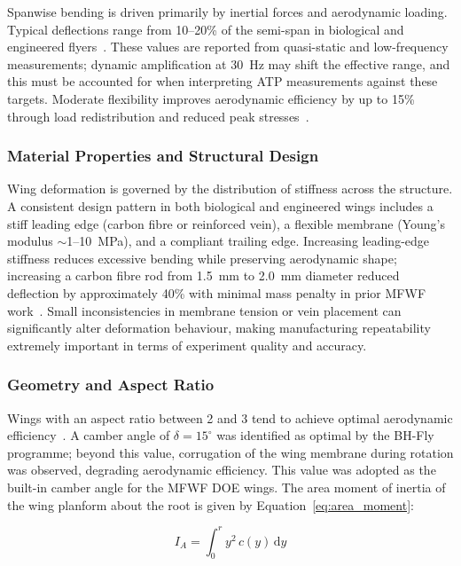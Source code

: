 Spanwise bending is driven primarily by inertial forces and aerodynamic loading. Typical deflections range from 10--20\% of the semi-span in biological and engineered flyers~\cite{combes2003flexural}. These values are reported from quasi-static and low-frequency measurements; dynamic amplification at 30~Hz may shift the effective range, and this must be accounted for when interpreting ATP measurements against these targets. Moderate flexibility improves aerodynamic efficiency by up to 15\% through load redistribution and reduced peak stresses~\cite{kang2011effects}.

\subsubsection{Material Properties and Structural Design}

Wing deformation is governed by the distribution of stiffness across the structure. A consistent design pattern in both biological and engineered wings includes a stiff leading edge (carbon fibre or reinforced vein), a flexible membrane (Young's modulus $\sim$1--10~MPa), and a compliant trailing edge. Increasing leading-edge stiffness reduces excessive bending while preserving aerodynamic shape; increasing a carbon fibre rod from 1.5~mm to 2.0~mm diameter reduced deflection by approximately 40\% with minimal mass penalty in prior MFWF work~\cite{MFWF_FinalReport2023}. Small inconsistencies in membrane tension or vein placement can significantly alter deformation behaviour, making manufacturing repeatability extremely important in terms of experiment quality and accuracy.

\subsubsection{Geometry and Aspect Ratio}

Wings with an aspect ratio between 2 and 3 tend to achieve optimal aerodynamic efficiency~\cite{bhfly2025, oppenheimer2017}. A camber angle of $\delta = 15^\circ$ was identified as optimal by the BH-Fly programme; beyond this value, corrugation of the wing membrane during rotation was observed, degrading aerodynamic efficiency. This value was adopted as the built-in camber angle for the MFWF DOE wings. The area moment of inertia of the wing planform about the root is given by Equation~\ref{eq:area_moment}:

\begin{equation}
    I_A = \int_0^r y^2\, c(y)\, \mathrm{d}y
    \label{eq:area_moment}
\end{equation}

